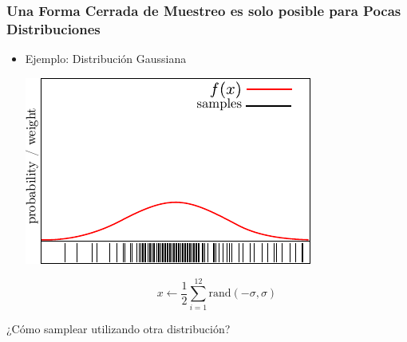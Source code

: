 \begin{frame}
    \frametitle{Una Forma Cerrada de Muestreo es solo posible para Pocas Distribuciones}

    \begin{itemize}
        \item Ejemplo: Distribución Gaussiana
        
        \begin{center}
            \includegraphics[width=0.5\columnwidth]{./images/particle_filter/gaussian_approximation_by_sampling.pdf}
        \end{center}
        
        \begin{equation*}
            x \leftarrow \frac{1}{2} \sum_{i=1}^{12} \text{rand}(-\sigma, \sigma)
        \end{equation*}
    \end{itemize}

    ¿Cómo samplear utilizando otra distribución?



\end{frame}
    



